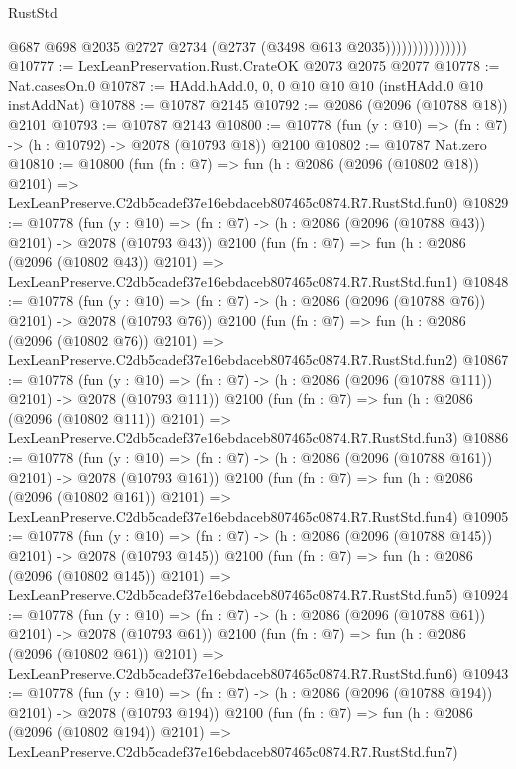 \begin{lexlean}{RustStd}
\begin{coremodule}
                              @687
                              @698
                              @2035
                              @2727
                              @2734
                              (@2737 (@3498 @613 @2035)))))))))))))))
@10777 := LexLeanPreservation.Rust.CrateOK @2073 @2075 @2077
@10778 := Nat.casesOn.{0}
@10787 := HAdd.hAdd.{0, 0, 0} @10 @10 @10 (instHAdd.{0} @10 instAddNat)
@10788 := @10787 @2145
@10792 := @2086 (@2096 (@10788 @18)) @2101
@10793 := @10787 @2143
@10800 := @10778 (fun (y : @10) => (fn : @7) -> (h : @10792) -> @2078 (@10793 @18)) @2100
@10802 := @10787 Nat.zero
@10810 := @10800
    (fun (fn : @7) =>
    fun (h : @2086 (@2096 (@10802 @18)) @2101) =>
    LexLeanPreserve.C2db5cadef37e16ebdaceb807465c0874.R7.RustStd.fun0)
@10829 := @10778
    (fun (y : @10) => (fn : @7) -> (h : @2086 (@2096 (@10788 @43)) @2101) -> @2078 (@10793 @43))
    @2100
    (fun (fn : @7) =>
    fun (h : @2086 (@2096 (@10802 @43)) @2101) =>
    LexLeanPreserve.C2db5cadef37e16ebdaceb807465c0874.R7.RustStd.fun1)
@10848 := @10778
    (fun (y : @10) => (fn : @7) -> (h : @2086 (@2096 (@10788 @76)) @2101) -> @2078 (@10793 @76))
    @2100
    (fun (fn : @7) =>
    fun (h : @2086 (@2096 (@10802 @76)) @2101) =>
    LexLeanPreserve.C2db5cadef37e16ebdaceb807465c0874.R7.RustStd.fun2)
@10867 := @10778
    (fun (y : @10) => (fn : @7) -> (h : @2086 (@2096 (@10788 @111)) @2101) -> @2078 (@10793 @111))
    @2100
    (fun (fn : @7) =>
    fun (h : @2086 (@2096 (@10802 @111)) @2101) =>
    LexLeanPreserve.C2db5cadef37e16ebdaceb807465c0874.R7.RustStd.fun3)
@10886 := @10778
    (fun (y : @10) => (fn : @7) -> (h : @2086 (@2096 (@10788 @161)) @2101) -> @2078 (@10793 @161))
    @2100
    (fun (fn : @7) =>
    fun (h : @2086 (@2096 (@10802 @161)) @2101) =>
    LexLeanPreserve.C2db5cadef37e16ebdaceb807465c0874.R7.RustStd.fun4)
@10905 := @10778
    (fun (y : @10) => (fn : @7) -> (h : @2086 (@2096 (@10788 @145)) @2101) -> @2078 (@10793 @145))
    @2100
    (fun (fn : @7) =>
    fun (h : @2086 (@2096 (@10802 @145)) @2101) =>
    LexLeanPreserve.C2db5cadef37e16ebdaceb807465c0874.R7.RustStd.fun5)
@10924 := @10778
    (fun (y : @10) => (fn : @7) -> (h : @2086 (@2096 (@10788 @61)) @2101) -> @2078 (@10793 @61))
    @2100
    (fun (fn : @7) =>
    fun (h : @2086 (@2096 (@10802 @61)) @2101) =>
    LexLeanPreserve.C2db5cadef37e16ebdaceb807465c0874.R7.RustStd.fun6)
@10943 := @10778
    (fun (y : @10) => (fn : @7) -> (h : @2086 (@2096 (@10788 @194)) @2101) -> @2078 (@10793 @194))
    @2100
    (fun (fn : @7) =>
    fun (h : @2086 (@2096 (@10802 @194)) @2101) =>
    LexLeanPreserve.C2db5cadef37e16ebdaceb807465c0874.R7.RustStd.fun7)

\end{coremodule}
\end{lexlean}

